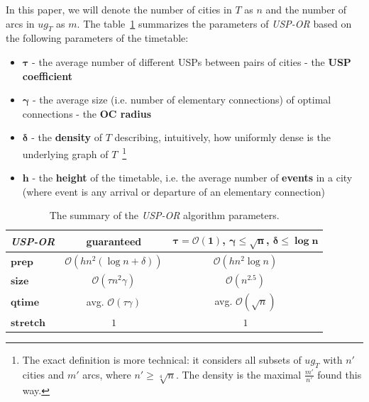 \documentclass{svk_long_en}
\begin{document}
		In this paper, we will denote the number of cities in $T$ as $n$ and the number of arcs in $ug_{T}$ as $m$.
		The table~\ref{tab:uspor} summarizes the parameters of \textit{USP-OR} based on the following parameters of the timetable:
		\begin{itemize}
			\item $\bm{\tau}$ - the average number of different USPs between pairs of cities - the \textbf{USP coefficient}
			\item $\bm{\gamma}$ - the average size (i.e. number of elementary connections) of optimal connections - the \textbf{OC radius}
			\item $\bm{\delta}$ - the \textbf{density} of $T$ describing, intuitively, how uniformly dense is the underlying graph of $T$~\footnote{The exact definition is more technical: it considers all subsets of $ug_{T}$ with $n'$ cities and $m'$ arcs, where $n' \geq \sqrt[4]{n}$. The density is the maximal $\frac{m'}{n'}$ found this way.}
			\item $\bm{h}$ - the \textbf{height} of the timetable, i.e. the average number of \textbf{events} in a city (where event is any arrival or departure of an elementary connection)
		\end{itemize}
		
		\begin{table}[h!]
			\centering
			\small
			\begin{tabular}{l|c|c}
				\cellcolor{oracle-clr} \textit{\textbf{USP-OR}} & \cellcolor{oracle-clr} \textbf{guaranteed} & \cellcolor{oracle-clr} \parbox{1.8cm}{\textbf{$\bm{\tau = \mathcal{O}(1)}$,\\ $\bm{\gamma \leq \sqrt{n}}$,\\ $\bm{\delta \leq \log n}$}} \\ [2.75ex]
				\hline
				 $\bm{prep}$ & $\mathcal{O}(hn^{2} (\log n + \delta))$ & $\mathcal{O}(hn^{2} \log n)$ \\	
				 $\bm{size}$ & $\mathcal{O}(\tau n^{2} \gamma)$ & $\mathcal{O}(n^{2.5})$ \\
				 $\bm{qtime}$ & avg. $\mathcal{O}(\tau \gamma)$ & avg. $\mathcal{O}(\sqrt{n})$ \\
				 $\bm{stretch}$ & $1$ & $1$ \\
			\end{tabular}
			\caption{\label{tab:uspor} The summary of the \textit{USP-OR} algorithm parameters.}
		\end{table}
	
\end{document}
